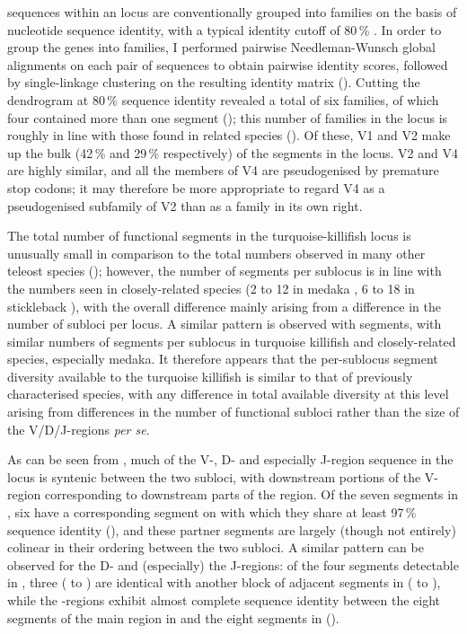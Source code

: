 \vh sequences within an \igh{} locus are conventionally grouped into families on the basis of nucleotide sequence identity, with a typical identity cutoff of 80\,\% \parencite{magadan2015fishrepertoires}. In order to group the \Nfu \vh genes into families, I performed pairwise Needleman-Wunsch global alignments on each pair of \vh sequences to obtain pairwise identity scores, followed by single-linkage clustering on the resulting identity matrix (). Cutting the dendrogram at 80\,\% sequence identity revealed a total of six \vh families, of which four contained more than one \vh segment (); this number of \vh families in the \Nfu locus is roughly in line with those found in related species (). Of these, V1 and V2 make up the bulk (42\,\% and 29\,\% respectively) of the \vh segments in the locus. V2 and V4 are highly similar, and all the members of V4 are pseudogenised by premature stop codons; it may therefore be more appropriate to regard V4 as a pseudogenised subfamily of V2 than as a \vh family in its own right.

The total number of functional \vh segments in the turquoise-killifish locus is unusually small in comparison to the total numbers observed in many other teleost species (); however, the number of segments per sublocus is in line with the numbers seen in closely-related species (2 to 12 in medaka \parencite{magadan2011medaka}, 6 to 18 in stickleback \parencite{gambondeza2011stickleback,bao2010stickleback}), with the overall difference mainly arising from a difference in the number of subloci per locus. A similar pattern is observed with \jh segments, with similar numbers of segments per sublocus in turquoise killifish and closely-related species, especially medaka. It therefore appears that the per-sublocus segment diversity available to the turquoise killifish is similar to that of previously characterised species, with any difference in total available diversity at this level arising from differences in the number of functional subloci rather than the size of the V/D/J-regions \textit{per se}.

As can be seen from , much of the V-, D- and especially J-region sequence in the \Nfu locus is syntenic between the two \igh{} subloci, with downstream portions of the  V-region corresponding to downstream parts of the  region. Of the seven \vh segments in , six have a corresponding segment on  with which they share at least 97\,\% sequence identity (), and these partner segments are largely (though not entirely) colinear in their ordering between the two subloci. A similar pattern can be observed for the D- and (especially) the J-regions: of the four \dh segments detectable in , three ( to ) are identical with another block of adjacent \dh segments in  ( to ), while the \jh-regions exhibit almost complete sequence identity between the eight \jh segments of the main \jh region in  and the eight \jh segments in  ().
		
